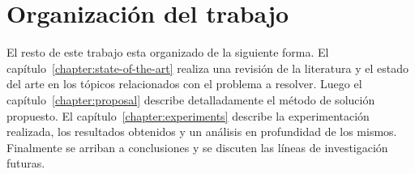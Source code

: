 \section*{Organización del trabajo}

El resto de este trabajo esta organizado de la siguiente forma.
El capítulo~\ref{chapter:state-of-the-art} realiza una revisión de la literatura y el estado del arte en los tópicos relacionados con el problema a resolver.
Luego el capítulo~\ref{chapter:proposal} describe detalladamente el método de solución propuesto.
El capítulo~\ref{chapter:experiments} describe la experimentación realizada, los resultados obtenidos y un análisis en profundidad de los mismos.
Finalmente se arriban a conclusiones y se discuten las líneas de investigación futuras.
